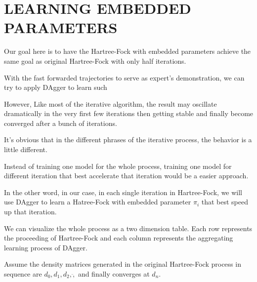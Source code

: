\documentclass[twoside]{article}
\begin{document}
\section{LEARNING EMBEDDED PARAMETERS}

Our goal here is to have the Hartree-Fock with embedded parameters achieve the same goal as original Hartree-Fock with only half iterations.

With the fast forwarded trajectories to serve as expert's demonstration, we can try to apply DAgger to learn such 

However,
Like most of the iterative algorithm, the result may oscillate dramatically in the very first few iterations then getting stable and finally become converged after a bunch of iterations. 

It's obvious that in the different phrases of the iterative process, the behavior is a little different. 


Instead of training one model for the whole process,
training one model for different iteration that best accelerate that iteration would be a easier approach.




% 

In the other word, in our case, in each single iteration in Hartree-Fock,  we will use DAgger to learn a Hatree-Fock with embedded parameter $\pi_i$ that best speed up that iteration.  


We can visualize the whole process as a two dimension table.
Each row represents the proceeding of Hartree-Fock and each column represents the aggregating learning process of DAgger.
 

Assume the density matrices generated in the original Hartree-Fock process in sequence are  $d_0, d_1, d_2, \ddot,$ and finally converges at $d_n$.
\end{document}

